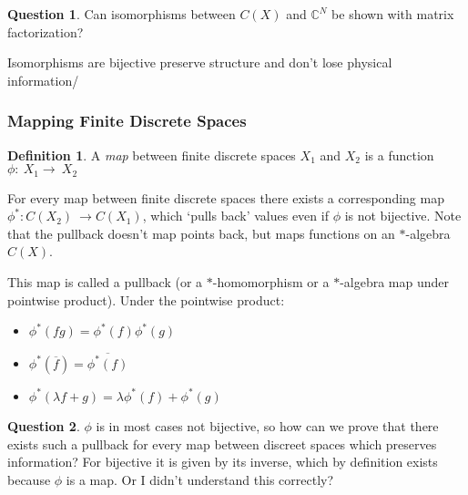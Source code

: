 \documentclass[a4paper]{article}
\theoremstyle{definition}
\newtheorem{definition}{Definition}
\theoremstyle{definition}
\newtheorem{question}{Question}
\theoremstyle{theorem}
\theoremstyle{theorem}
\theoremstyle{definition}
\begin{document}
\begin{question}
    Can isomorphisms between $C(X)$ and $\mathbb{C}^N$ be shown with matrix factorization?
\end{question}
    Isomorphisms are bijective preserve structure and don't lose physical information/

\subsubsection{Mapping Finite Discrete Spaces}

\begin{definition}
    A \textit{map} between finite discrete spaces $X_1$ and $X_2$ is a function $\phi:\ X_1 \rightarrow\ X_2$
\end{definition}

For every map between finite discrete spaces there exists a corresponding map \\
$\phi ^*:C(X_2)\ \rightarrow C(X_1)$, which `pulls back' values even if $\phi$ is not bijective.
Note that the pullback doesn't map points back, but maps functions on an $*$-algebra $C(X)$.


This map is called a pullback (or a $*$-homomorphism or a $*$-algebra map under pointwise product).
Under the pointwise product:
\begin{itemize}
    \item $\phi ^*(fg) = \phi ^*(f) \phi ^*(g)$
    \item $\phi ^*(\overline{f}) = \overline{\phi ^*(f)}$
    \item $\phi ^*(\lambda f + g) = \lambda \phi ^*(f) + \phi ^*(g)$
\end{itemize}

\begin{question}
    $\phi$ is in most cases not bijective, so how can we prove that there exists such a
    pullback for every map between discreet spaces which preserves information? For bijective
    it is given by its inverse, which by definition exists because $\phi$ is a map.
    Or I didn't understand this correctly?
\end{question}
\end{document}
